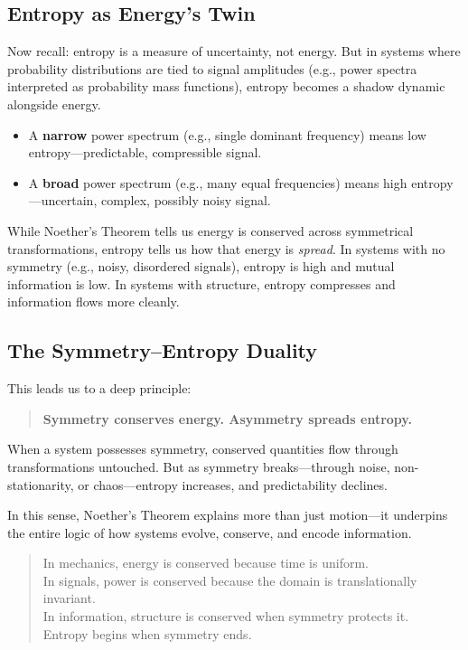 \subsection{Entropy as Energy’s Twin}

Now recall: entropy is a measure of uncertainty, not energy. But in systems where probability distributions are tied to signal amplitudes (e.g., power spectra interpreted as probability mass functions), entropy becomes a shadow dynamic alongside energy.

\begin{itemize}
    \item A \textbf{narrow} power spectrum (e.g., single dominant frequency) means low entropy—predictable, compressible signal.
    \item A \textbf{broad} power spectrum (e.g., many equal frequencies) means high entropy—uncertain, complex, possibly noisy signal.
\end{itemize}

While Noether’s Theorem tells us energy is conserved across symmetrical transformations, entropy tells us how that energy is \emph{spread}. In systems with no symmetry (e.g., noisy, disordered signals), entropy is high and mutual information is low. In systems with structure, entropy compresses and information flows more cleanly.

\subsection{The Symmetry–Entropy Duality}

This leads us to a deep principle:

\begin{quote}
\textbf{Symmetry conserves energy. Asymmetry spreads entropy.}
\end{quote}

When a system possesses symmetry, conserved quantities flow through transformations untouched. But as symmetry breaks—through noise, non-stationarity, or chaos—entropy increases, and predictability declines.

In this sense, Noether’s Theorem explains more than just motion—it underpins the entire logic of how systems evolve, conserve, and encode information.

\begin{quote}
In mechanics, energy is conserved because time is uniform. \\
In signals, power is conserved because the domain is translationally invariant. \\
In information, structure is conserved when symmetry protects it. \\
Entropy begins when symmetry ends.
\end{quote}
